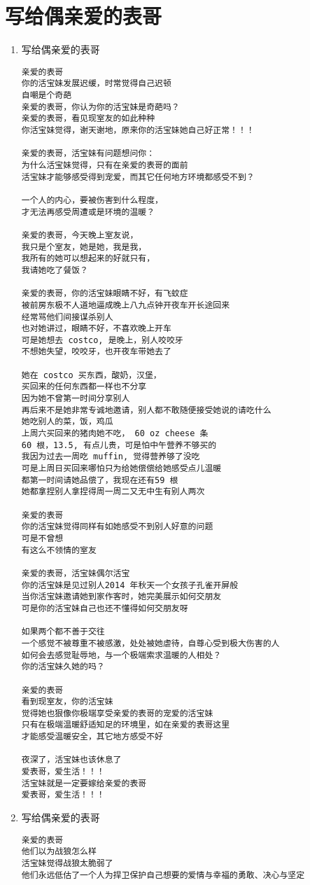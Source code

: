 \documentclass[9pt, b5paper]{article}
\begin{document}
\section{写给偶亲爱的表哥}
\label{sec-4}
\begin{enumerate}
\item 写给偶亲爱的表哥
\label{sec-4-0-0-1}
\begin{verbatim}
亲爱的表哥
你的活宝妹发展迟缓，时常觉得自己迟顿
自嘲是个奇葩
亲爱的表哥，你认为你的活宝妹是奇葩吗？
亲爱的表哥，看见现室友的如此种种
你活宝妹觉得，谢天谢地，原来你的活宝妹她自己好正常！！！

亲爱的表哥，活宝妹有问题想问你：
为什么活宝妹觉得，只有在亲爱的表哥的面前
活宝妹才能够感受得到宠爱，而其它任何地方环境都感受不到？

一个人的内心，要被伤害到什么程度，
才无法再感受周遭或是环境的温暖？

亲爱的表哥，今天晚上室友说，
我只是个室友，她是她，我是我，
我所有的她可以想起来的好就只有，
我请她吃了餐饭？

亲爱的表哥，你的活宝妹眼睛不好，有飞蚊症
被前房东极不人道地逼成晚上八九点钟开夜车开长途回来
经常骂他们间接谋杀别人
也对她讲过，眼睛不好，不喜欢晚上开车
可是她想去 costco, 是晚上，别人咬咬牙
不想她失望，咬咬牙，也开夜车带她去了

她在 costco 买东西，酸奶，汉堡，
买回来的任何东西都一样也不分享
因为她不曾第一时间分享别人
再后来不是她非常专诚地邀请，别人都不敢随便接受她说的请吃什么
她吃别人的菜，饭，鸡瓜
上周六买回来的猪肉她不吃， 60 oz cheese 条
60 根，13.5, 有点儿贵，可是怕中午营养不够买的
我因为过去一周吃 muffin, 觉得营养够了没吃
可是上周日买回来哪怕只为给她偿偿给她感受点儿温暖
都第一时间请她品偿了，我现在还有59 根
她都拿捏别人拿捏得周一周二又无中生有别人两次

亲爱的表哥
你的活宝妹觉得同样有如她感受不到别人好意的问题
可是不曾想
有这么不领情的室友

亲爱的表哥，活宝妹偶尔活宝 
你的活宝妹是见过别人2014 年秋天一个女孩子孔雀开屏般
当你活宝妹邀请她到家作客时，她完美展示如何交朋友
可是你的活宝妹自己也还不懂得如何交朋友呀

如果两个都不善于交往
一个感觉不被尊重不被感激，处处被她虐待，自尊心受到极大伤害的人
如何会去感觉耻辱地，与一个极端索求温暖的人相处？
你的活宝妹久她的吗？

亲爱的表哥
看到现室友，你的活宝妹
觉得她也狠像你极端享受亲爱的表哥的宠爱的活宝妹
只有在极端温暖舒适知足的环境里，如在亲爱的表哥这里
才能感受温暖安全，其它地方感受不好

夜深了，活宝妹也该休息了
爱表哥，爱生活！！！
活宝妹就是一定要嫁给亲爱的表哥
爱表哥，爱生活！！！
\end{verbatim}
\item 写给偶亲爱的表哥
\label{sec-4-0-0-2}
\begin{verbatim}
亲爱的表哥
他们以为战狼怎么样
活宝妹觉得战狼太脆弱了
他们永远低估了一个人为捍卫保护自己想要的爱情与幸福的勇敢、决心与坚定


\end{verbatim}
\end{enumerate}
\end{document}
